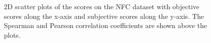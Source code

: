 \begin{figure}[H]
\centering
    \caption{2D scatter plots of the scores on the NFC dataset with objective scores along the x-axis and subjective scores along the y-axis. The Spearman and Pearson correlation coefficients are shown above the plots.}
    \label{fig:ourDS1corr}
\end{figure}

